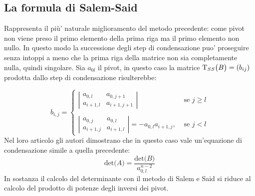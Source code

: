 \documentclass{article}
\begin{document}
\subsection{La formula di Salem-Said}
Rappresenta il più' naturale miglioramento del metodo precedente: come pivot non viene preso il primo elemento della prima riga ma il primo elemento non nullo. In questo modo la successione degli step di condensazione puo' proseguire senza intoppi a meno che la prima riga della matrice non sia completamente nulla, quindi singolare.
\newline
Sia $a_{0l}$ il pivot, in questo caso la matrice $ \mbox{T}_{\small SS}\big(B\big)=(b_{ij})$ prodotta dallo step di condensazione risulterebbe:

	\begin{equation}
		b_{i,j}= 
		\begin{cases} 
			\left| \begin{array}{cc} a_{0,l} & a_{0,j+1}  \\ a_{i+1 , l} & a_{i+1 , j+1}  \end{array} \right| & \mbox{ se } j \geq l \\ 
			 & \\
			\left| \begin{array}{cc} a_{0,j} & a_{0,l}  \\ a_{i+1 , j} & a_{i+1 , l}  \end{array} \right| = -a_{0,l} a_{i+1 , j}, & \mbox{ se } j<l
		\end{cases}
	\end{equation}
Nel loro articolo \cite{arx:SalemSaid} gli autori dimostrano che in questo caso vale un'equazione di condensazione simile a quella precedente:
	\begin{equation}
		 \mbox{det}\big(A\big) = \dfrac{\mbox{det}\big(B\big)}{a_{0,l}^{n-2}}
	\end{equation}
In sostanza il calcolo del determinante con il metodo di Salem e Said si riduce al calcolo del prodotto di potenze degli inversi dei pivot.
\end{document}
